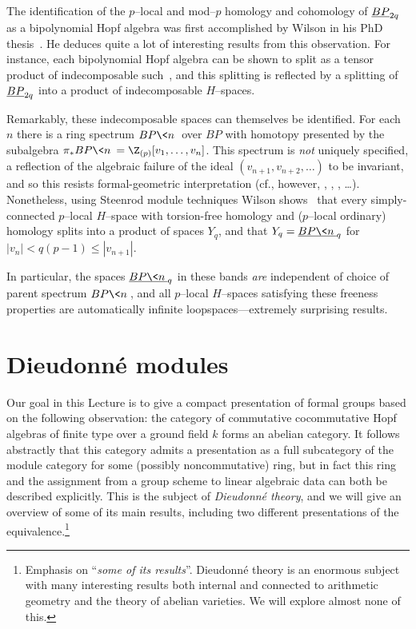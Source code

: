 \begin{remark}\label{WilsonSpaces}
The identification of the \(p\)--local and mod--\(p\) homology and cohomology of \(\OS{BP}{2q}\) as a bipolynomial Hopf algebra was first accomplished by Wilson in his PhD thesis~\cite[Theorem 3.3]{WilsonThesisI}.  He deduces quite a lot of interesting results from this observation.  For instance, each bipolynomial Hopf algebra can be shown to split as a tensor product of indecomposable such~\cite[Proposition 3.5]{WilsonThesisI}, and this splitting is reflected by a splitting of \(\OS{BP}{2q}\) into a product of indecomposable \(H\)--spaces.

Remarkably, these indecomposable spaces can themselves be identified.  For each \(n\) there is a ring spectrum \(BP\<n\>\) over \(BP\) with homotopy presented by the subalgebra \(\pi_* BP\<n\> = \Z_{(p)}[v_1, \ldots, v_n]\).  This spectrum is \emph{not} uniquely specified, a reflection of the algebraic failure of the ideal \((v_{n+1}, v_{n+2}, \ldots)\) to be invariant, and so this resists formal-geometric interpretation (cf., however, \cite{AngeltveitLind}, \cite{LawsonNaumann}, \cite{StricklandProductsOnModules}, \ldots).  Nonetheless, using Steenrod module techniques Wilson shows~\cite[Section 6]{WilsonThesisII} that every simply-connected \(p\)--local \(H\)--space with torsion-free homology and (\(p\)--local ordinary) homology splits into a product of spaces \(Y_q\), and that \(Y_q = \OS{BP\<n\>}{q}\) for \(|v_n| < q(p-1) \le |v_{n+1}|\).

In particular, the spaces \(\OS{BP\<n\>}{q}\) in these bands \emph{are} independent of choice of parent spectrum \(BP\<n\>\), and all \(p\)--local \(H\)--spaces satisfying these freeness properties are automatically infinite loopspaces---extremely surprising results.
\end{remark}










\section{Dieudonn\'e modules}\label{SectionDieudonneModules}

Our goal in this Lecture is to give a compact presentation of formal groups based on the following observation: the category of commutative cocommutative Hopf algebras of finite type over a ground field \(k\) forms an abelian category.  It follows abstractly that this category admits a presentation as a full subcategory of the module category for some (possibly noncommutative) ring, but in fact this ring and the assignment from a group scheme to linear algebraic data can both be described explicitly.  This is the subject of \textit{Dieudonn\'e theory}, and we will give an overview of some of its main results, including two different presentations of the equivalence.\footnote{Emphasis on ``\emph{some of its results}''.  Dieudonn\'e theory is an enormous subject with many interesting results both internal and connected to arithmetic geometry and the theory of abelian varieties.  We will explore almost none of this.}

